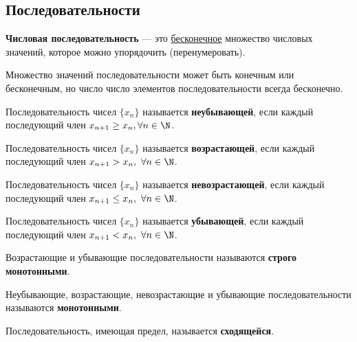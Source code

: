 \subsection{Последовательности}

\begin{definition}
  \textbf{Числовая последовательность} --- это \underline{бесконечное} множество числовых значений, которое можно упорядочить (перенумеровать).
\end{definition}

\begin{note}
  Множество значений последовательности может быть конечным или бесконечным, но число число элементов последовательности всегда бесконечно.
\end{note}

\begin{definition}
  Последовательность чисел $\{x_{n}\}$ называется \textbf{неубывающей}, если каждый последующий член $x_{n+1} \ge x_{n}, \forall n\in \N$.
\end{definition}

\begin{definition}
  Последовательность чисел $\{x_{n}\} $ называется \textbf{возрастающей}, если каждый последующий член $x_{n+1} > x_{n},\ \forall n \in \N$.
\end{definition}

\begin{definition}
  Последовательность чисел $\{x_{n}\} $ называется \textbf{невозрастающей}, если каждый последующий член $x_{n+1} \le x_{n},\ \forall n \in \N$.
\end{definition}

\begin{definition}
  Последовательность чисел $\{x_{n}\} $ называется \textbf{убывающей}, если каждый последующий член $x_{n+1} < x_{n},\ \forall n \in \N$.
\end{definition}

\begin{definition}
  Возрастающие и убывающие последовательности называются \textbf{строго монотонными}.
\end{definition}

\begin{definition}
  Неубывающие, возрастающие, невозрастающие и убывающие последовательности называются \textbf{монотонными}.
\end{definition}

\begin{definition}
  Последовательность, имеющая предел, называется \textbf{сходящейся}.
\end{definition}

